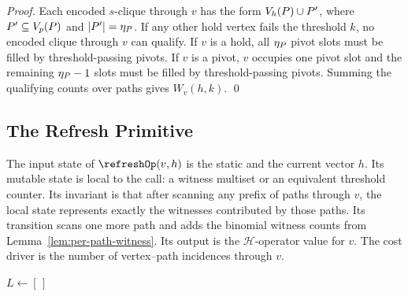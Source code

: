 \begin{proof}
Each encoded \(s\)-clique through \(v\) has the form \(\Vh(\TPath)\cup P'\), where \(P'\subseteq\Vp(\TPath)\) and \(|P'|=\eta_{\TPath}\).
%
If any other hold vertex fails the threshold \(k\), no encoded clique through \(v\) can qualify.
%
If \(v\) is a hold, all \(\eta_{\TPath}\) pivot slots must be filled by threshold-passing pivots.
%
If \(v\) is a pivot, \(v\) occupies one pivot slot and the remaining \(\eta_{\TPath}-1\) slots must be filled by threshold-passing pivots.
%
Summing the qualifying counts over paths gives \(W_v(h,k)\).
%
\qed
\end{proof}

\subsection{The Refresh Primitive}\label{sec:refresh}

The input state of \(\refreshOp(v,h)\) is the static \cpi{} and the current vector \(h\).
%
Its mutable state is local to the call: a witness multiset or an equivalent threshold counter.
%
Its invariant is that after scanning any prefix of paths through \(v\), the local state represents exactly the witnesses contributed by those paths.
%
Its transition scans one more path and adds the binomial witness counts from Lemma~\ref{lem:per-path-witness}.
%
Its output is the \(\mathcal{H}\)-operator value for \(v\).
%
The cost driver is the number of vertex--path incidences through \(v\).

\begin{algorithm}[t]
\algfontsize
\caption{\(\refreshOp(v,h)\) --- per-vertex \(h\)-index over the static \cpi.}
\label{alg:refresh}

\(L \gets [\,]\) 
\end{algorithm}

